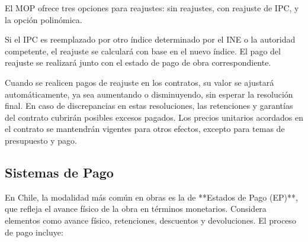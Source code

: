 El MOP ofrece tres opciones para reajustes: sin reajustes, con reajuste de IPC, y la opción polinómica.

Si el IPC es reemplazado por otro índice determinado por el INE o la autoridad competente, el reajuste se calculará con base en el nuevo índice. El pago del reajuste se realizará junto con el estado de pago de obra correspondiente.

Cuando se realicen pagos de reajuste en los contratos, su valor se ajustará automáticamente, ya sea aumentando o disminuyendo, sin esperar la resolución final. En caso de discrepancias en estas resoluciones, las retenciones y garantías del contrato cubrirán posibles excesos pagados. Los precios unitarios acordados en el contrato se mantendrán vigentes para otros efectos, excepto para temas de presupuesto y pago.

\subsection{Sistemas de Pago}

En Chile, la modalidad más común en obras es la de **Estados de Pago (EP)**, que refleja el avance físico de la obra en términos monetarios. Considera elementos como avance físico, retenciones, descuentos y devoluciones. El proceso de pago incluye:

